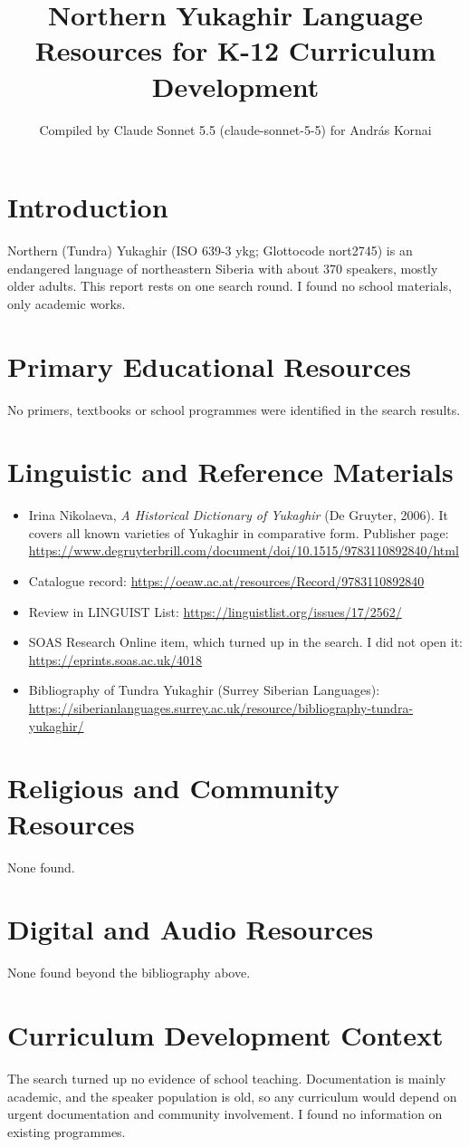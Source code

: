 \documentclass[12pt]{article}
\title{Northern Yukaghir Language Resources for K-12 Curriculum Development}
\author{Compiled by Claude Sonnet 5.5 (claude-sonnet-5-5) for Andr\'as Kornai}
\date{}
\begin{document}
\maketitle

\section{Introduction}
Northern (Tundra) Yukaghir (ISO 639-3 ykg; Glottocode nort2745) is an endangered language of northeastern Siberia with about 370 speakers, mostly older adults. This report rests on one search round. I found no school materials, only academic works.

\section{Primary Educational Resources}
No primers, textbooks or school programmes were identified in the search results.

\section{Linguistic and Reference Materials}
\begin{itemize}
\item Irina Nikolaeva, \emph{A Historical Dictionary of Yukaghir} (De Gruyter, 2006). It covers all known varieties of Yukaghir in comparative form. Publisher page: \url{https://www.degruyterbrill.com/document/doi/10.1515/9783110892840/html}
\item Catalogue record: \url{https://oeaw.ac.at/resources/Record/9783110892840}
\item Review in LINGUIST List: \url{https://linguistlist.org/issues/17/2562/}
\item SOAS Research Online item, which turned up in the search. I did not open it: \url{https://eprints.soas.ac.uk/4018}
\item Bibliography of Tundra Yukaghir (Surrey Siberian Languages): \url{https://siberianlanguages.surrey.ac.uk/resource/bibliography-tundra-yukaghir/}
\end{itemize}

\section{Religious and Community Resources}
None found.

\section{Digital and Audio Resources}
None found beyond the bibliography above.

\section{Curriculum Development Context}
The search turned up no evidence of school teaching. Documentation is mainly academic, and the speaker population is old, so any curriculum would depend on urgent documentation and community involvement. I found no information on existing programmes.
\end{document}
